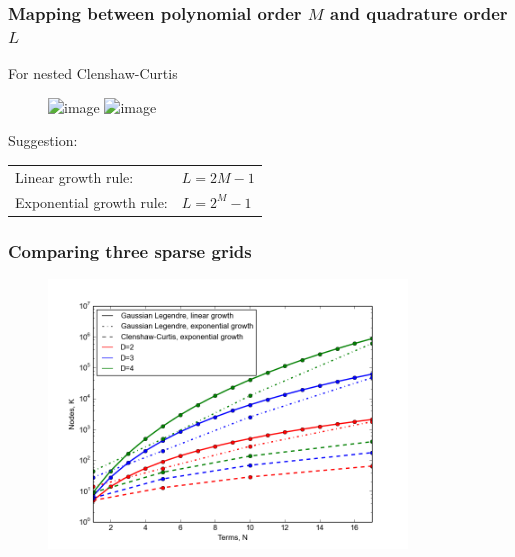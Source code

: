\documentclass{beamer}
\begin{document}
  \begin{frame}
   \frametitle{Mapping between polynomial order $M$ and quadrature order $L$}
   For nested Clenshaw-Curtis
   \begin{figure}
    \includegraphics<1>[width=0.85\textwidth]{LvsM2.png}
    \includegraphics<2->[width=0.85\textwidth]{LvsM1.png}
   \end{figure} \pause \pause

   \begin{alert}{Suggestion:}

       \begin{tabular}{ll}
       Linear growth rule: & $L=2M-1$ \\
       Exponential growth rule: & $L=2^M-1$ \\
       \end{tabular}
   \end{alert}


  \end{frame}

 \begin{frame}
  \frametitle{Comparing three sparse grids}

 \begin{figure}
  \includegraphics[width=0.85\textwidth]{dimensionality_nodes_nested2.png}
 \end{figure}
 \end{frame}
\end{document}
